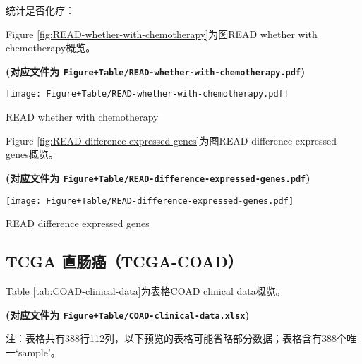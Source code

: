 \documentclass[
]{article}
\begin{document}
统计是否化疗：

Figure \ref{fig:READ-whether-with-chemotherapy}为图READ whether with chemotherapy概览。

\textbf{(对应文件为 \texttt{Figure+Table/READ-whether-with-chemotherapy.pdf})}

\def\@captype{figure}
\begin{center}
\texttt{[image: Figure+Table/READ-whether-with-chemotherapy.pdf]}
\caption{READ whether with chemotherapy}\label{fig:READ-whether-with-chemotherapy}
\end{center}

Figure \ref{fig:READ-difference-expressed-genes}为图READ difference expressed genes概览。

\textbf{(对应文件为 \texttt{Figure+Table/READ-difference-expressed-genes.pdf})}

\def\@captype{figure}
\begin{center}
\texttt{[image: Figure+Table/READ-difference-expressed-genes.pdf]}
\caption{READ difference expressed genes}\label{fig:READ-difference-expressed-genes}
\end{center}

\hypertarget{tcga-ux76f4ux80a0ux764ctcga-coad}{%
\subsection{TCGA 直肠癌（TCGA-COAD）}\label{tcga-ux76f4ux80a0ux764ctcga-coad}}

Table \ref{tab:COAD-clinical-data}为表格COAD clinical data概览。

\textbf{(对应文件为 \texttt{Figure+Table/COAD-clinical-data.xlsx})}

\begin{center}\begin{tcolorbox}[colback=gray!10, colframe=gray!50, width=0.9\linewidth, arc=1mm, boxrule=0.5pt]注：表格共有388行112列，以下预览的表格可能省略部分数据；表格含有388个唯一`sample'。
\end{tcolorbox}
\end{center}
\end{document}
